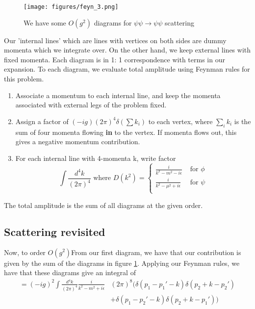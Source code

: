 \documentclass[11pt, oneside]{article}   	%
\theoremstyle{newline}
\theoremstyle{newline}
\theoremstyle{newline}
\theoremstyle{newline}
\theoremstyle{newline}
\begin{document}
\begin{figure}[htpb]
\centering
\texttt{[image: figures/feyn\_3.png]}
\caption{We have some $ O ( g ^ 2 )$ diagrams for $ \psi \psi \to \psi \psi$ scattering}%
\label{fig:figures/feyn_3}
\end{figure}
Our 'internal lines' which are lines with vertices on
both sides are dummy momenta which we integrate over. 
On the other hand, we keep external lines with fixed momenta. 
Each diagram is in 1: 1 correspondence with 
terms in our expansion. 
To each diagram, we evaluate total amplitude using 
Feynman rules for this problem. 
\begin{enumerate}
\item Associate a momentum to each internal line, and keep 
the momenta associated with external legs of the problem 
fixed. 
\item Assign a factor of  $ ( - i g) ( 2 \pi ) ^ 4 \delta ( \sum k_ i ) $
to each vertex, where  $ \sum_i k _ i $ is the sum of 
four momenta flowing \textbf{ in } to the vertex. If momenta 
flows out, this gives a negative momentum contribution. 
\item For each internal line with 4-momenta k, write 
factor 
\[
	\int \frac{ d^ 4 k }{ ( 2 \pi ) ^ 4  } \text{ where } D ( k ^ 2 )  = \begin{cases}
		\frac{ i }{ k ^ 2 - m ^ 2  - i \epsilon } &  \text{ for } \phi \\
		\frac{i }{ k ^ 2 - \mu ^ 2 + i \epsilon } & \text{ for } \psi \\ 
	\end{cases}
\] 
\end{enumerate}
The total amplitude is the sum of all diagrams at the given order. 

\subsection{Scattering revisited} 
Now, to order $ O ( g ^ 2)  $From our first diagram, we have that our contribution is 
given by the sum of the diagrams in figure \ref{fig:figures/feyn_3}. Applying our 
Feynman rules, we have that these diagrams give an integral
of 
\begin{align*}
=( - i g ) ^ 2 \int \frac{ d^ 4 k }{ ( 2 \pi ) ^ 4 } \frac{ i }{ k ^ 2 - m ^ 2 + i \epsilon } &  ( 2 \pi ) ^ 8 ( \delta ( p_1 - p_1 ' - k ) \delta ( p_2 + k - p_2 ' ) \\
										      & + \delta ( p_1 - p_2' - k ) \delta ( p_2 + k - p_1 ' ) ) 	
\end{align*}
\end{document}
